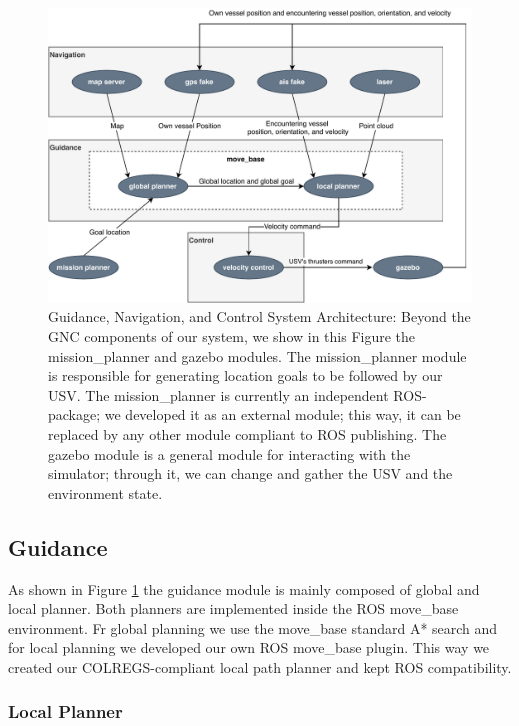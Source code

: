     \begin{figure}
        \centering
        \includegraphics[scale=0.75]{figs/Chap4/gnc_arch.pdf}
        \caption{Guidance, Navigation, and Control System Architecture: Beyond the GNC components of our system, we show in this Figure the mission\_planner and gazebo modules. The mission\_planner module is responsible for generating location goals to be followed by our \ac{USV}. The mission\_planner is currently an independent ROS-package; we developed it as an external module; this way, it can be replaced by any other module compliant to ROS publishing. The gazebo module is a general module for interacting with the simulator; through it, we can change and gather the \ac{USV} and the environment state.}
        \label{fig:gnc_arch}
    \end{figure}
    
    \subsection{Guidance}
    
        As shown in Figure \ref{fig:gnc_arch} the guidance module is mainly composed of global and local planner. Both planners are implemented inside the ROS move\_base environment. Fr global planning we use the move\_base standard A* search and for local planning we developed our own ROS move\_base plugin. This way we created our COLREGS-compliant local path planner and kept ROS compatibility.

        \subsubsection{Local Planner}
        
